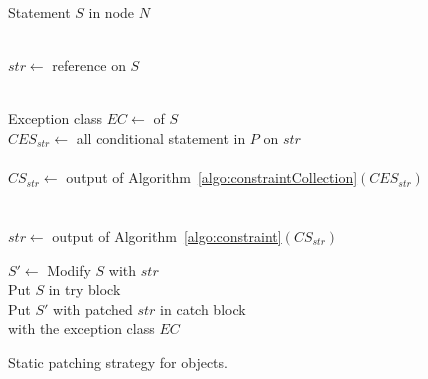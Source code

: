 \begin{algorithm}[t]
\scriptsize
\DontPrintSemicolon
{}
\Begin
{
  {
  Statement $S$ in node $N$\\
   {\\
  	\mytab $str \longleftarrow$  reference on $S$
  	
  	 {\\
  	  \mytab Exception class $EC \longleftarrow$  of
$S$\\
          \mytab $CES_{str} \longleftarrow$ all conditional statement in $P$ on
$str$\\
 \mytab  {}\\
  	  \mytab $CS_{str} \longleftarrow$ output of
Algorithm~\ref{algo:constraintCollection}$(CES_{str})$\\

  		\mytab {} {\\
  		
  		 \mytab  {}\\
  			\mytab \mytab $str \longleftarrow$ output of
Algorithm~\ref{algo:constraint}$(CS_{str})$
  		}
  		
  		\mytab {}
  		
  		
  		\mytab $S'\longleftarrow$ Modify $S$ with $str$ \\
  		\mytab Put $S$ in try block\\
  		\mytab Put $S'$ with patched $str$ in catch block \\
  		\mytab with the exception class $EC$	
    }
    \vspace{-2em}
  }
 }
}
\caption{Static patching strategy for  objects.}
\label{algo:patchingStrategy}
\end{algorithm}

